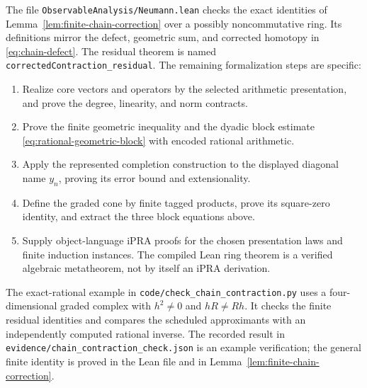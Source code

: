 The file \texttt{ObservableAnalysis/Neumann.lean} checks the exact
identities of Lemma~\ref{lem:finite-chain-correction} over a possibly
noncommutative ring.  Its definitions mirror the defect, geometric sum,
and corrected homotopy in \eqref{eq:chain-defect}.
The residual theorem is named
\texttt{correctedContraction\_residual}.
The remaining formalization steps are specific:
\begin{enumerate}
\item Realize core vectors and operators by the selected arithmetic
  presentation, and prove the degree, linearity, and norm contracts.
\item Prove the finite geometric inequality and the dyadic block estimate
  \eqref{eq:rational-geometric-block} with encoded rational arithmetic.
\item Apply the represented completion construction to the displayed
  diagonal name $y_n$, proving its error bound and extensionality.
\item Define the graded cone by finite tagged products, prove its
  square-zero identity, and extract the three block equations above.
\item Supply object-language iPRA proofs for the chosen presentation
  laws and finite induction instances.  The compiled Lean ring theorem
  is a verified algebraic metatheorem, not by itself an iPRA derivation.
\end{enumerate}

The exact-rational example in \texttt{code/check\_chain\_contraction.py}
uses a four-dimensional graded complex with $h^2\ne0$ and $hR\ne Rh$.
It checks the finite residual identities and compares the scheduled
approximants with an independently computed rational inverse.  The
recorded result in \texttt{evidence/chain\_contraction\_check.json}
is an example verification; the general finite identity is proved in the
Lean file and in Lemma~\ref{lem:finite-chain-correction}.
